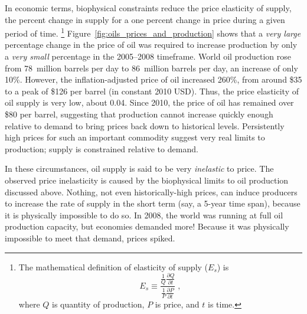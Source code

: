 In economic terms, biophysical constraints reduce the 
price elasticity of supply, the 
percent change in supply for a one percent change in price
during a given period of time.%
	\footnote{
	The mathematical definition of elasticity of supply ($E_s$) is
	\begin{equation*}
		E_s \equiv \frac{\frac{1}{Q}\frac{\partial Q}{\partial t}}
					{\frac{1}{P}\frac{\partial P}{\partial t}} \; ,
	\end{equation*}%
	where $Q$ is quantity of production, $P$ is price, and $t$ is time.
	}
Figure~\ref{fig:oils_prices_and_production} shows that 
a \emph{very large} percentage change in the price of oil was required to 
increase production by only a \emph{very small} percentage
in the 2005--2008 timeframe.
World oil production rose from 
78~million barrels per day to 86~million barrels per day,
an increase of only 10\%.\cite{EIA2014}
However, the inflation-adjusted price of oil increased 260\%,
from around \$35 to a peak of \$126 per barrel 
(in constant 2010 USD).
Thus, the price elasticity of oil supply is very low, about 0.04.
Since 2010, the price of oil has remained over \$80 per barrel,
suggesting that production cannot increase quickly enough relative to demand
to bring prices back down to historical levels.
Persistently high prices for such an important commodity
suggest very real limits to production; 
supply is constrained relative to demand. 

In these circumstances, 
oil supply is said to be very \emph{inelastic} to price.
The observed price inelasticity is caused by 
the biophysical limits to oil production discussed above.
Nothing, not even historically-high prices, can induce producers to 
increase the rate of supply in the short term (say, a 5-year time span), 
because it is physically impossible to do so.
In 2008, the world was running at full oil production capacity, 
but economies demanded more!
Because it was physically impossible to meet that demand,
prices spiked.


